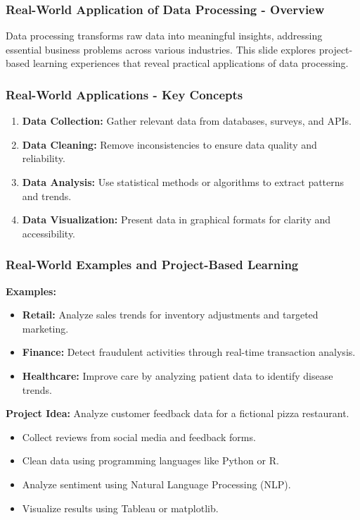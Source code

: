 \documentclass{beamer}
\begin{document}
\begin{frame}[fragile]
    \frametitle{Real-World Application of Data Processing - Overview}
    Data processing transforms raw data into meaningful insights, addressing essential business problems across various industries. This slide explores project-based learning experiences that reveal practical applications of data processing.
\end{frame}

\begin{frame}[fragile]
    \frametitle{Real-World Applications - Key Concepts}
    \begin{enumerate}
        \item \textbf{Data Collection:} Gather relevant data from databases, surveys, and APIs.
        \item \textbf{Data Cleaning:} Remove inconsistencies to ensure data quality and reliability.
        \item \textbf{Data Analysis:} Use statistical methods or algorithms to extract patterns and trends.
        \item \textbf{Data Visualization:} Present data in graphical formats for clarity and accessibility.
    \end{enumerate}
\end{frame}

\begin{frame}[fragile]
    \frametitle{Real-World Examples and Project-Based Learning}
    \textbf{Examples:}
    \begin{itemize}
        \item \textbf{Retail:} Analyze sales trends for inventory adjustments and targeted marketing.
        \item \textbf{Finance:} Detect fraudulent activities through real-time transaction analysis.
        \item \textbf{Healthcare:} Improve care by analyzing patient data to identify disease trends.
    \end{itemize}
    
    \textbf{Project Idea:} Analyze customer feedback data for a fictional pizza restaurant.
    \begin{itemize}
        \item Collect reviews from social media and feedback forms.
        \item Clean data using programming languages like Python or R.
        \item Analyze sentiment using Natural Language Processing (NLP).
        \item Visualize results using Tableau or matplotlib.
    \end{itemize}
\end{frame}
\end{document}
